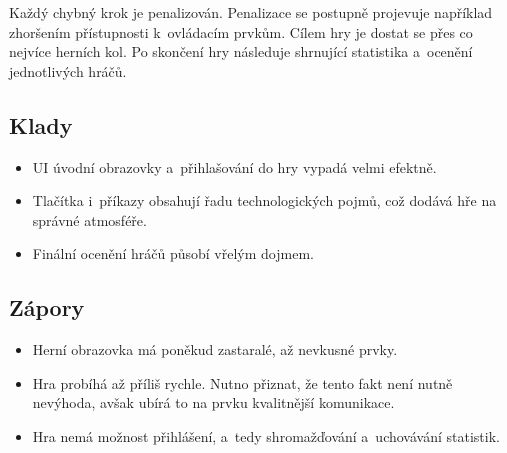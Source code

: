 Každý chybný krok je penalizován.
Penalizace se postupně projevuje například zhoršením přístupnosti k~ovládacím
prvkům.
Cílem hry je dostat se přes co nejvíce herních kol.
Po skončení hry následuje shrnující statistika a~ocenění jednotlivých hráčů.

\subsection*{Klady}

\begin{itemize}
    \item UI úvodní obrazovky a~přihlašování do hry vypadá velmi efektně.
    \item Tlačítka i~příkazy obsahují řadu technologických pojmů,
    což dodává hře na správné atmosféře.
    \item Finální ocenění hráčů působí vřelým dojmem.
\end{itemize}

\subsection*{Zápory}

\begin{itemize}
    \item Herní obrazovka má poněkud zastaralé, až nevkusné prvky.
    \item Hra probíhá až příliš rychle.
    Nutno přiznat, že tento fakt není nutně nevýhoda,
    avšak ubírá to na prvku kvalitnější komunikace.
    \item Hra nemá možnost přihlášení,
    a~tedy shromažďování a~uchovávání statistik.
\end{itemize}

